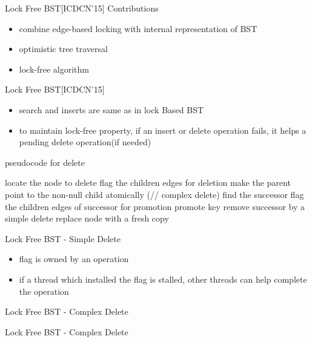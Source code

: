 \begin{frame}[c]{Lock Free BST[ICDCN'15]}
Contributions
\begin{itemize}
\item combine edge-based locking with internal representation of BST 
\item optimistic tree traversal 
\pause
\item lock-free algorithm
\end{itemize}
\end{frame}

\begin{frame}{Lock Free BST[ICDCN'15]}
\begin{itemize}
\item search and inserts are same as in lock Based BST
\item to maintain lock-free property, if an insert or delete operation fails, it helps a pending delete operation(if needed)
\end{itemize} 
pseudocode for delete
\begin{algorithm}[H]
locate the node to delete\;
flag the children edges for deletion\;
{
make the parent point to the non-null child atomically\;
}
\Else(// complex delete)
{
find the successor\;
flag the children edges of successor for promotion\;
promote key\;
remove successor by a simple delete\;
replace node with a fresh copy\;
}
\end{algorithm}
\end{frame}

\begin{frame}[c]{Lock Free BST - Simple Delete}
\begin{itemize}
\item flag is owned by an operation
\item if a thread which installed the flag is stalled, other threads can help complete the operation
\end{itemize}
\pause

\end{frame}

\begin{frame}[c]{Lock Free BST - Complex Delete}

\end{frame}
\begin{frame}[c]{Lock Free BST - Complex Delete}

\end{frame}